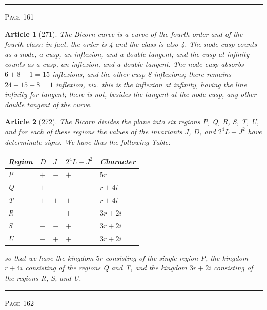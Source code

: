 \documentclass[11pt,a4paper]{article}
\theoremstyle{cayley}
\newtheorem{art}{Article}
\begin{document}
\vspace{1em}
\noindent\rule{\textwidth}{0.4pt}
\begin{center}\textsc{Page 161}\end{center}
\newpage

\begin{art}[271]
The Bicorn curve is a curve of the fourth order and of the fourth class; in fact, the order is 4 and the class is also 4. The node-cusp counts as a node, a cusp, an inflexion, and a double tangent; and the cusp at infinity counts as a cusp, an inflexion, and a double tangent. The node-cusp absorbs $6 + 8 + 1 = 15$ inflexions, and the other cusp 8 inflexions; there remains $24 - 15 - 8 = 1$ inflexion, viz.\ this is the inflexion at infinity, having the line infinity for tangent; there is not, besides the tangent at the node-cusp, any other double tangent of the curve.
\end{art}

\begin{art}[272]
The Bicorn divides the plane into six regions P, Q, R, S, T, U, and for each of these regions the values of the invariants $J$, $D$, and $2^4L - J^2$ have determinate signs. We have thus the following Table:
\begin{center}
\begin{tabular}{lllll}
\toprule
Region & $D$ & $J$ & $2^4L - J^2$ & Character \\
\midrule
P & $+$ & $-$ & $+$ & $5r$ \\
Q & $+$ & $-$ & $-$ & $r+4i$ \\
T & $+$ & $+$ & $+$ & $r+4i$ \\
R & $-$ & $-$ & $\pm$ & $3r+2i$ \\
S & $-$ & $-$ & $+$ & $3r+2i$ \\
U & $-$ & $+$ & $+$ & $3r+2i$ \\
\bottomrule
\end{tabular}
\end{center}
so that we have the kingdom $5r$ consisting of the single region P, the kingdom $r+4i$ consisting of the regions Q and T, and the kingdom $3r+2i$ consisting of the regions R, S, and U.
\end{art}

\vspace{1em}
\noindent\rule{\textwidth}{0.4pt}
\begin{center}\textsc{Page 162}\end{center}
\newpage
\end{document}
